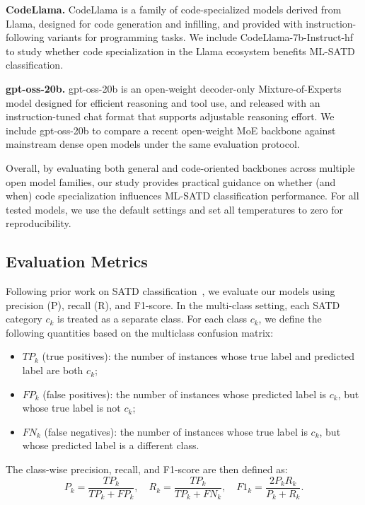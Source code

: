 \documentclass[acmsmall,screen,review,anonymous]{acmart}
\begin{document}
\noindent\textbf{CodeLlama.}
CodeLlama \cite{roziere2023code} is a family of code-specialized models derived from Llama, designed for code generation and infilling, and provided with instruction-following variants for programming tasks. We include CodeLlama-7b-Instruct-hf to study whether code specialization in the Llama ecosystem benefits ML-SATD classification.

\noindent\textbf{gpt-oss-20b.}
gpt-oss-20b \cite{agarwal2025gpt} is an open-weight decoder-only Mixture-of-Experts model designed for efficient reasoning and tool use, and released with an instruction-tuned chat format that supports adjustable reasoning effort. We include gpt-oss-20b to compare a recent open-weight MoE backbone against mainstream dense open models under the same evaluation protocol.

\noindent

Overall, by evaluating both general and code-oriented backbones across multiple open model families, our study provides practical guidance on whether (and when) code specialization influences ML-SATD classification performance. For all tested models, we use the default settings and set all temperatures to zero for reproducibility.


\subsection{Evaluation Metrics}
\label{subsec:evaluation_metrics}

Following prior work on SATD classification~\cite{huang2018identifying}, we evaluate our models using precision (P), recall (R), and F1-score. In the multi-class setting, each SATD category $c_k$ is treated as a separate class. For each class $c_k$, we define the following quantities based on the multiclass confusion matrix:
\begin{itemize}
  \item $TP_k$ (true positives): the number of instances whose true label and predicted label are both $c_k$;
  \item $FP_k$ (false positives): the number of instances whose predicted label is $c_k$, but whose true label is not $c_k$;
  \item $FN_k$ (false negatives): the number of instances whose true label is $c_k$, but whose predicted label is a different class.
\end{itemize}
The class-wise precision, recall, and F1-score are then defined as:
\begin{equation}
  P_k = \frac{TP_k}{TP_k + FP_k}, \quad
  R_k = \frac{TP_k}{TP_k + FN_k}, \quad
  F1_k = \frac{2 P_k R_k}{P_k + R_k}.
\end{equation}
\end{document}
